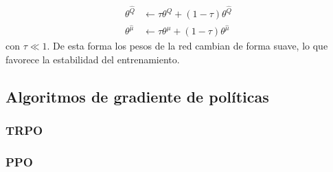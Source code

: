 \begin{align}
\theta ^{\hat Q} &\leftarrow \tau \theta ^ Q + (1 - \tau)\theta^{\hat Q}\\
\theta ^{\hat \mu} &\leftarrow \tau \theta ^ \mu + (1 - \tau)\theta^{\hat \mu}
\end{align}
con $\tau \ll  1$. De esta forma los pesos de la red cambian de forma suave, lo que favorece la estabilidad del entrenamiento. 

\subsection{Algoritmos de gradiente de políticas} \label{ALG_GRAD_POL}

\subsubsection{TRPO}
\subsubsection{PPO}